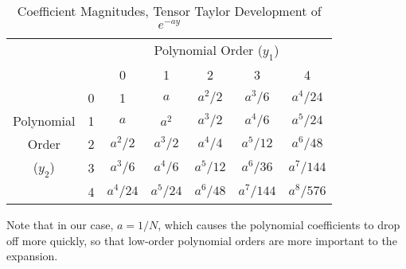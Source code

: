 \begin{table}
  \centering
  \begin{tabular}{|c c|c c c c c|}
    \cline{3-7}\multicolumn{2}{c|}{ } & \multicolumn{5}{c|}{Polynomial Order ($y_1$)} \\
               \multicolumn{2}{c|}{ } & 0 & 1 & 2 & 3 & 4 \\
    \hline & 0 & 1        & $a$      & $a^2/2$  & $a^3/6$   & \cellcolor{Gray6}$a^4/24$  \\
Polynomial & 1 & $a$      & $a^2   $ & $a^3/2 $ & \cellcolor{Gray6}$a^4/6  $ & $a^5/24 $ \\
Order      & 2 & $a^2/2$  & $a^3/2 $ & \cellcolor{Gray6}$a^4/4 $ & $a^5/12 $ & $a^6/48 $ \\
($y_2$)    & 3 & $a^3/ 6$ & \cellcolor{Gray6}$a^4/ 6$ & $a^5/12$ & $a^6/ 36$ & $a^7/144$ \\
           & 4 & \cellcolor{Gray6}$a^4/24$ & $a^5/24$ & $a^6/48$ & $a^7/144$ & $a^8/576$ \\
    \hline
  \end{tabular}
  \caption{Coefficient Magnitudes, Tensor Taylor Development of $e^{-ay}$}
  \label{tab:atten coeffs}
\end{table}
Note that in our case, $a=1/N$, which causes the polynomial coefficients to drop off more quickly, so that
low-order polynomial orders are more important to the expansion.

